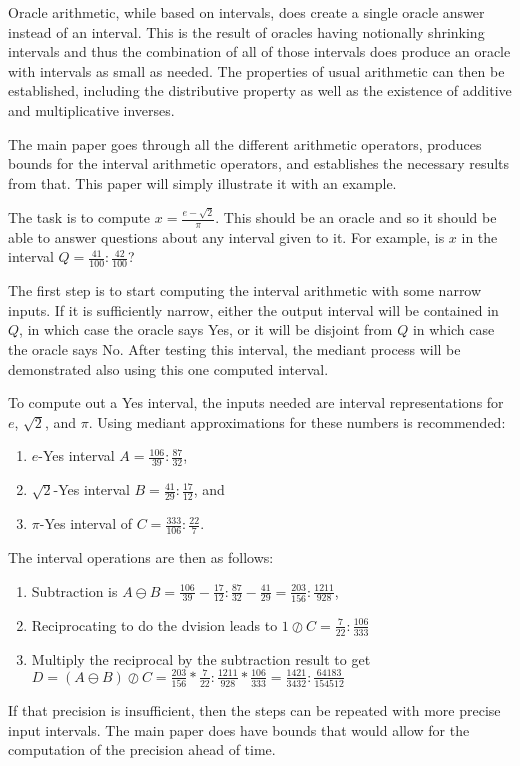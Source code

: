 \documentclass[12pt]{article}
\theoremstyle{remark}
\begin{document}
Oracle arithmetic, while based on intervals, does create a single oracle answer instead of an interval. This is the result of oracles having notionally shrinking intervals and thus the combination of all of those intervals does produce an oracle with intervals as small as needed. The properties of usual arithmetic can then be established, including the distributive property as well as the existence of additive and multiplicative inverses.   

The main paper goes through all the different arithmetic operators, produces bounds for the interval arithmetic operators, and establishes the necessary results from that. This paper will simply illustrate it with an example. 

The task is to compute $x = \frac{e-\sqrt{2}}{\pi}$. This should be an oracle and so it should be able to answer questions about any interval given to it. For example, is $x$ in the interval $Q = \frac{41}{100}: \frac{42}{100}$? 

The first step is to start computing the interval arithmetic with some narrow inputs. If it is sufficiently narrow, either the output interval will be contained in $Q$, in which case the oracle says Yes, or it will be disjoint from $Q$ in which case the oracle says No. After testing this interval, the mediant process will be demonstrated also using this one computed interval. 

To compute out a Yes interval, the inputs needed are interval representations for $e$, $\sqrt{2}$, and $\pi$. Using mediant approximations for these numbers is recommended: 
\begin{enumerate}
\item $e$-Yes interval $A  = \frac{106}{39}: \frac{87}{32}$,
\item $\sqrt{2}$-Yes interval $B = \frac{41}{29}: \frac{17}{12}$, and
\item $\pi$-Yes interval of $C= \frac{333}{106}: \frac{22}{7}$.
\end{enumerate}
The interval operations are then as follows:
\begin{enumerate}
\item Subtraction is $A\ominus B = \frac{106}{39} - \frac{17}{12}: \frac{87}{32} - \frac{41}{29} = \frac{203}{156}: \frac{1211}{928}$,
\item Reciprocating to do the dvision leads to  $1\oslash C = \frac{7}{22}: \frac{106}{333}$
\item Multiply the reciprocal by the subtraction result to get $D = (A\ominus B)\oslash C = \frac{203}{156} *\frac{7}{22}: \frac{1211}{928} * \frac{106}{333} = \frac{1421}{3432}: \frac{64183}{154512}$
\end{enumerate}
If that precision is insufficient, then the steps can be repeated with more precise input intervals. The main paper does have bounds that would allow for the computation of the precision ahead of time. 
\end{document}
